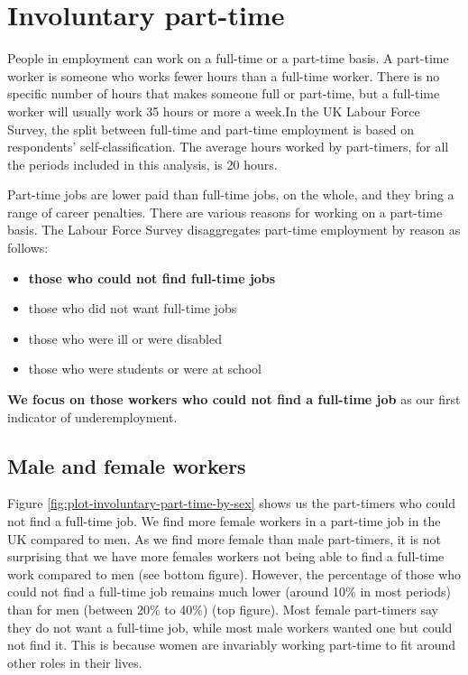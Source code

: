 \documentclass[
]{book}
\providecommand{\tightlist}{%
  \setlength{\itemsep}{0pt}\setlength{\parskip}{0pt}}
\begin{document}
\hypertarget{involuntary-part-time}{%
\section{Involuntary part-time}\label{involuntary-part-time}}

People in employment can work on a full-time or a part-time basis. A part-time worker is someone who works fewer hours than a full-time worker. There is no specific number of hours that makes someone full or part-time, but a full-time worker will usually work 35 hours or more a week.In the UK Labour Force Survey, the split between full-time and part-time employment is based on respondents' self-classification. The average hours worked by part-timers, for all the periods included in this analysis, is 20 hours.

Part-time jobs are lower paid than full-time jobs, on the whole, and they bring a range of career penalties. There are various reasons for working on a part-time basis. The Labour Force Survey disaggregates part-time employment by reason as follows:

\begin{itemize}
\tightlist
\item
  \textbf{those who could not find full-time jobs}
\item
  those who did not want full-time jobs
\item
  those who were ill or were disabled
\item
  those who were students or were at school
\end{itemize}

\textbf{We focus on those workers who could not find a full-time job} as our first indicator of underemployment.

\hypertarget{male-and-female-workers}{%
\subsection{Male and female workers}\label{male-and-female-workers}}

Figure \ref{fig:plot-involuntary-part-time-by-sex} shows us the part-timers who could not find a full-time job. We find more female workers in a part-time job in the UK compared to men. As we find more female than male part-timers, it is not surprising that we have more females workers not being able to find a full-time work compared to men (see bottom figure). However, the percentage of those who could not find a full-time job remains much lower (around 10\% in most periods) than for men (between 20\% to 40\%) (top figure). Most female part-timers say they do not want a full-time job, while most male workers wanted one but could not find it. This is because women are invariably working part-time to fit around other roles in their lives.
\end{document}
